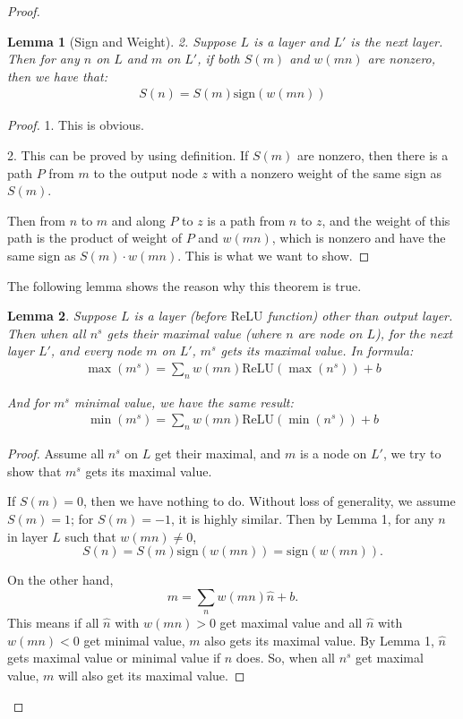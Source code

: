 \documentclass[]{article}
\newtheorem{lemma}{Lemma}
\theoremstyle{definition}
\newcommand{\ReLU}{\mathrm{ReLU}}
\begin{document}
\begin{proof}
\begin{lemma}[Sign and Weight]
	2. Suppose $L$ is a layer and $L'$ is the next layer. Then for any $n$ on $L$ and $m$ on $L'$, if both $S(m)$ and $w(mn)$ are nonzero, then we have that: \begin{align}
		S(n)=S(m)\mathrm{sign}(w(mn))
	\end{align}
\end{lemma}
\begin{proof}
	1. This is obvious.
	
	2. This can be proved by using definition. If $S(m)$ are nonzero, then there is a path $P$ from $m$ to the output node  $z$ with a nonzero weight of the same sign as $S(m)$. 
	
	Then from $n$ to $m$ and along $P$ to $z$ is a path from $n$ to $z$, and the weight of this path is the product of weight of $P$ and $w(mn)$, which is nonzero and have the same sign as $S(m)\cdot w(mn)$. This is what we want to show.
\end{proof}

The following lemma shows the reason why this theorem is true.

\begin{lemma}
	Suppose $L$ is a layer (before $\ReLU$ function) other than output layer. Then when all $n^s$ gets their maximal value (where $n$ are node on $L$), for the next layer $L'$, and every node $m$ on $L'$, $m^s$ gets its maximal value. In formula: \begin{align}
		\max(m^s)=\sum_{n}w(mn)\ReLU(\max(n^s))+b
	\end{align}
	
	And for $m^s$ minimal value, we have the same result: \begin{align}
		\min(m^s)=\sum_{n}w(mn)\ReLU(\min(n^s))+b
	\end{align}
\end{lemma}

\begin{proof}
	Assume all $n^s$ on $L$ get their maximal, and $m$ is a node on $L'$, we try to show that $m^s$ gets its maximal value.
	
	If $S(m)=0$, then we have nothing to do. Without loss of generality,  we assume $S(m)=1$; for $S(m)=-1$, it is highly similar. Then by Lemma 1, for any $n$ in layer $L$ such that $w(mn)\neq 0$, $$S(n)=S(m)\mathrm{sign}(w(mn))=\mathrm{sign}(w(mn)).$$
	
	On the other hand, $$m=\sum_{n}w(mn)\hat{n}+b.$$ This means if all $\hat{n}$ with $w(mn)>0$ get maximal value and all $\hat{n}$ with $w(mn)<0$ get minimal value, $m$ also gets its maximal value. By Lemma 1, $\hat{n}$ gets maximal value or minimal value if $n$ does. So, when all $n^s$ get maximal value, $m$ will also get its maximal value.
	

\end{proof}
\end{proof}
\end{document}
